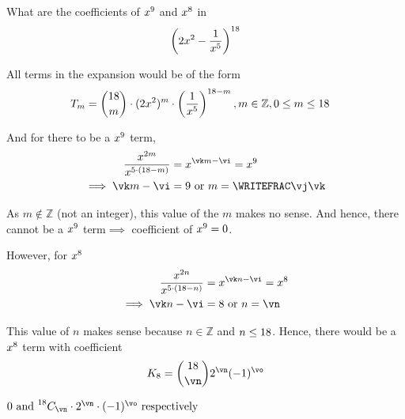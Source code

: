 



\MULTIPLY\vb\vd\vi
\ADD\vc\vi\vj 
\ADD\va\vb\vk 
\ADD\ve\vi\vl
\DIVIDE\vl\vk\vn
\SUBTRACT\vd\vn\vo

\question[3] What are the coefficients of $x^{9}$ and $x^{8}$ in 
\[\left( 2x^{2} - \dfrac{1}{x^{5}}\right)^{18}\]

\watchout

\ifprintanswers
\fi 

\begin{solution}[\halfpage]
  All terms in the expansion would be of the form 
  \begin{align}
    T_m &= \binom{18}{m}\cdot(2x^{2})^{m}\cdot\left(\dfrac{1}{x^{5}}\right)^{18 - m}
    , m \in\mathbb{Z}, 0\leq m\leq18
  \end{align}
  
  And for there to be a $x^{9}$ term, 
  \begin{align}
    \dfrac{x^{\va m}}{x^{\vb\cdot(\vd - m)}} &= x^{\vk m - \vi} = x^{\vc} \\
    \implies \vk m - \vi &= \vc\text{ or } m = \WRITEFRAC\vj\vk
  \end{align}

  As $m\notin\mathbb{Z}$ (not an integer),  this value of the $m$ makes no sense. 
  And hence, there cannot be a $x^9$ term$\implies$ coefficient of $x^9=0$.

  However, for $x^{8}$
  \begin{align}
    \dfrac{x^{\va n}}{x^{\vb\cdot(\vd - n)}} &= x^{\vk n - \vi} = x^{\ve} \\
    \implies \vk n - \vi &= \ve\text{ or } n = \vn 
  \end{align}

  This value of $n$ makes sense because $n\in\mathbb{Z}$ and $n\leq18$. Hence,
  there would be a $x^{8}$ term with coefficient 
  \[ K_{\ve} = \binom\vd\vn 2^{\vn}(-1)^{\vo} \]
\end{solution}

\ifprintanswers
  \begin{codex}
    $0\text{ and } ^{\vd}C_{\vn}\cdot 2^{\vn}\cdot(-1)^{\vo}\text{ respectively }$
  \end{codex}
\fi


